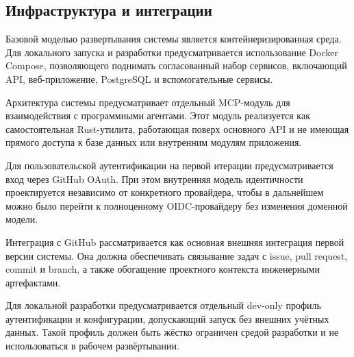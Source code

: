 \textheadingsep
\subsection{Инфраструктура и интеграции}

\headingtextsep

Базовой моделью развертывания системы является контейнеризированная среда. Для локального запуска и разработки предусматривается использование Docker Compose, позволяющего поднимать согласованный набор сервисов, включающий API, веб-приложение, PostgreSQL и вспомогательные сервисы.

Архитектура системы предусматривает отдельный MCP-модуль для взаимодействия с программными агентами. Этот модуль реализуется как самостоятельная Rust-утилита, работающая поверх основного API и не имеющая прямого доступа к базе данных или внутренним модулям приложения.

Для пользовательской аутентификации на первой итерации предусматривается вход через GitHub OAuth. При этом внутренняя модель идентичности проектируется независимо от конкретного провайдера, чтобы в дальнейшем можно было перейти к полноценному OIDC-провайдеру без изменения доменной модели.

Интеграция с GitHub рассматривается как основная внешняя интеграция первой версии системы. Она должна обеспечивать связывание задач с issue, pull request, commit и branch, а также обогащение проектного контекста инженерными артефактами.

Для локальной разработки предусматривается отдельный dev-only профиль аутентификации и конфигурации, допускающий запуск без внешних учётных данных. Такой профиль должен быть жёстко ограничен средой разработки и не использоваться в рабочем развёртывании.
